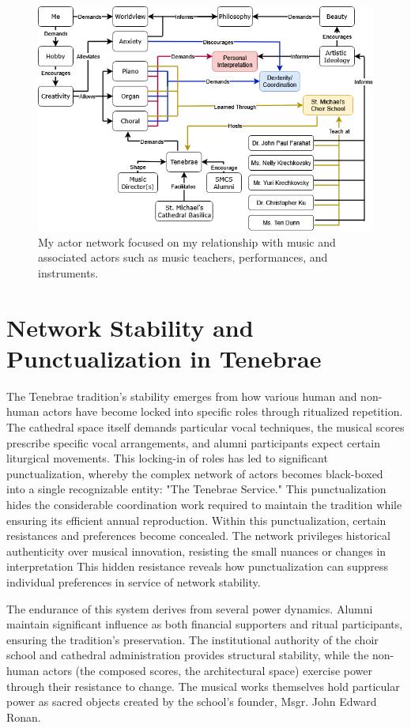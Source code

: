 \documentclass{article} %
\begin{document}
\begin{figure}[h!]            %
  \centering
  \includegraphics[width=0.9\linewidth]{Figs/Actor_Network.png}
  \caption{My actor network focused on my relationship with music and associated actors such as music teachers, performances, and instruments.}
  \label{fig:actor_network}
\end{figure}

\section{Network Stability and Punctualization in Tenebrae}

The Tenebrae tradition's stability emerges from how various human and non-human actors have become locked into specific roles through ritualized repetition.
The cathedral space itself demands particular vocal techniques, the musical scores prescribe specific vocal arrangements, and alumni participants expect certain liturgical movements.
This locking-in of roles has led to significant punctualization, whereby the complex network of actors becomes black-boxed into a single recognizable entity: "The Tenebrae Service."
This punctualization hides the considerable coordination work required to maintain the tradition while ensuring its efficient annual reproduction.
Within this punctualization, certain resistances and preferences become concealed.
The network privileges historical authenticity over musical innovation, resisting the small nuances or changes in interpretation
This hidden resistance reveals how punctualization can suppress individual preferences in service of network stability.

The endurance of this system derives from several power dynamics. 
Alumni maintain significant influence as both financial supporters and ritual participants, ensuring the tradition's preservation. 
The institutional authority of the choir school and cathedral administration provides structural stability, while the non-human actors (the composed scores, the architectural space) exercise power through their resistance to change. 
The musical works themselves hold particular power as sacred objects created by the school's founder, Msgr. John Edward Ronan.
\end{document}

